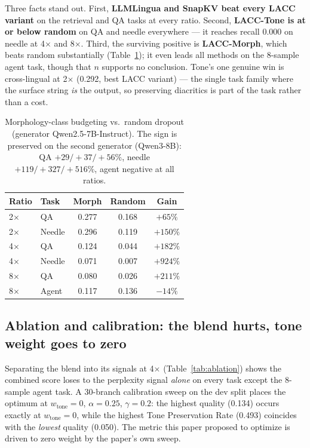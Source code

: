 \documentclass[runningheads]{llncs}
\newcommand{\method}[1]{\textsc{#1}}
\begin{document}
Three facts stand out. First, \textbf{LLMLingua and SnapKV beat every \method{LACC} variant} on the retrieval and QA tasks at every ratio. Second, \textbf{LACC-Tone is at or below random} on QA and needle everywhere --- it reaches recall 0.000 on needle at 4$\times$ and 8$\times$. Third, the surviving positive is \textbf{LACC-Morph}, which beats random substantially (Table~\ref{tab:morph}); it even leads all methods on the 8-sample agent task, though that $n$ supports no conclusion. Tone's one genuine win is cross-lingual at 2$\times$ (0.292, best \method{LACC} variant) --- the single task family where the surface string \emph{is} the output, so preserving diacritics is part of the task rather than a cost.

\begin{table}[H]
\centering
\caption{Morphology-class budgeting vs.\ random dropout (generator Qwen2.5-7B-Instruct). The sign is preserved on the second generator (Qwen3-8B): QA $+29/+37/+56\%$, needle $+119/+327/+516\%$, agent negative at all ratios.}
\label{tab:morph}
\begin{tabular}{llccc}
\toprule
\textbf{Ratio} & \textbf{Task} & \textbf{Morph} & \textbf{Random} & \textbf{Gain} \\
\midrule
2$\times$ & QA     & 0.277 & 0.168 & \textbf{$+65\%$} \\
2$\times$ & Needle & 0.296 & 0.119 & \textbf{$+150\%$} \\
4$\times$ & QA     & 0.124 & 0.044 & \textbf{$+182\%$} \\
4$\times$ & Needle & 0.071 & 0.007 & $+924\%$ \\
8$\times$ & QA     & 0.080 & 0.026 & $+211\%$ \\
8$\times$ & Agent  & 0.117 & 0.136 & $-14\%$ \\
\bottomrule
\end{tabular}
\end{table}

\subsection{Ablation and calibration: the blend hurts, tone weight goes to zero}

Separating the blend into its signals at 4$\times$ (Table~\ref{tab:ablation}) shows the combined score loses to the perplexity signal \emph{alone} on every task except the 8-sample agent task. A 30-branch calibration sweep on the dev split places the optimum at $w_{\text{tone}}{=}0$, $\alpha{=}0.25$, $\gamma{=}0.2$: the highest quality (0.134) occurs exactly at $w_{\text{tone}}{=}0$, while the highest Tone Preservation Rate (0.493) coincides with the \emph{lowest} quality (0.050). The metric this paper proposed to optimize is driven to zero weight by the paper's own sweep.
\end{document}
